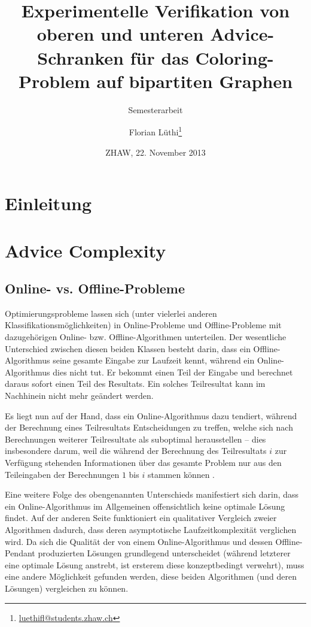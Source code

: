 \documentclass[11pt]{scrreprt} %
\title{Experimentelle Verifikation von oberen und unteren Advice-Schranken für das Coloring-Problem auf bipartiten Graphen}
\subtitle{Semesterarbeit}
\author{Florian Lüthi\footnote{\url{luethifl@students.zhaw.ch}}}
\date{ZHAW, 22. November 2013} %
\theoremstyle{definition}
\begin{document}
\maketitle

\tableofcontents

\chapter{Einleitung}


\chapter{Advice Complexity}

\section{Online- vs. Offline-Probleme}

Optimierungsprobleme lassen sich (unter vielerlei anderen Klassifikationsmöglichkeiten) in Online-Probleme und Offline-Probleme mit dazugehörigen Online- bzw. Offline-Algo\-rithmen unterteilen. Der wesentliche Unterschied zwischen diesen beiden Klassen besteht darin, dass ein Offline-Algorithmus seine gesamte Eingabe zur Laufzeit kennt, während ein Online-Algorithmus dies nicht tut. Er bekommt einen Teil der Eingabe und berechnet daraus sofort einen Teil des Resultats. Ein solches Teilresultat kann im Nachhinein nicht mehr geändert werden.

Es liegt nun auf der Hand, dass ein Online-Algorithmus dazu tendiert, während der Berechnung eines Teilresultats Entscheidungen zu treffen, welche sich nach Berechnungen weiterer Teilresultate als suboptimal herausstellen -- dies insbesondere darum, weil die während der Berechnung des Teilresultats $i$ zur Verfügung stehenden Informationen über das gesamte Problem nur aus den Teileingaben der Berechnungen $1$ bis $i$ stammen können \cite{BKK}.

\bigskip
Eine weitere Folge des obengenannten Unterschieds manifestiert sich darin, dass ein Online-Algorithmus im Allgemeinen offensichtlich keine optimale Lösung findet. Auf der anderen Seite funktioniert ein qualitativer Vergleich zweier Algorithmen dadurch, dass deren asymptotische Laufzeitkomplexität verglichen wird. Da sich die Qualität der von einem Online-Algorithmus und dessen Offline-Pendant produzierten Lösungen grundlegend unterscheidet (während letzterer eine optimale Lösung anstrebt, ist ersterem diese konzeptbedingt verwehrt), muss eine andere Möglichkeit gefunden werden, diese beiden Algorithmen (und deren Lösungen) vergleichen zu können.
\end{document}
